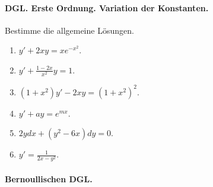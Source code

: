 

\paragraph{DGL. Erste Ordnung. Variation der Konstanten. } 
Bestimme die allgemeine Lösungen.
\begin{enumerate}
    \item $y' + 2xy = x e^{-x^{2}}$.
    \item $y' + \frac{1-2x}{x^{2}}y = 1$.
    \item $(1+x^2)y' -2xy = (1+x^2)^2$.
    \item $y' + ay = e^{mx}$.
    \item $2y dx + (y^2 -6x)dy = 0$.
    \item $y' = \frac{1}{2x - y^2}$.
\end{enumerate}


\paragraph{Bernoullischen DGL.} 
\begin{enumerate}
\end{enumerate}




